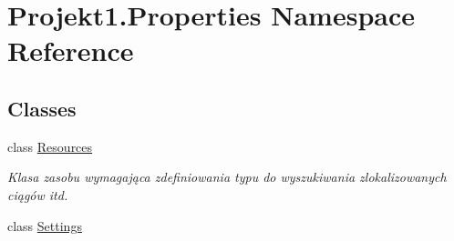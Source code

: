 \hypertarget{namespace_projekt1_1_1_properties}{}\section{Projekt1.\+Properties Namespace Reference}
\label{namespace_projekt1_1_1_properties}
\subsection*{Classes}
\begin{DoxyCompactItemize}
\item 
class \mbox{\hyperlink{class_projekt1_1_1_properties_1_1_resources}{Resources}}
\begin{DoxyCompactList}\small\item\em Klasa zasobu wymagająca zdefiniowania typu do wyszukiwania zlokalizowanych ciągów itd. \end{DoxyCompactList}\item 
class \mbox{\hyperlink{class_projekt1_1_1_properties_1_1_settings}{Settings}}
\end{DoxyCompactItemize}
